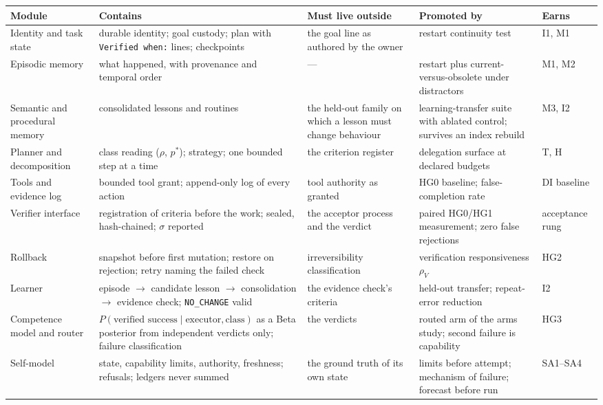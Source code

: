 \begin{table}[!htbp]
\centering\scriptsize
\begin{tabularx}{\textwidth}{@{}lYYYl@{}}
\toprule
Module & Contains & Must live outside & Promoted by & Earns \\
\midrule
Identity and task state & durable identity; goal custody; plan with \texttt{Verified when:} lines; checkpoints & the goal line as authored by the owner & restart continuity test & I1, M1 \\
Episodic memory & what happened, with provenance and temporal order & --- & restart plus current-versus-obsolete under distractors & M1, M2 \\
Semantic and procedural memory & consolidated lessons and routines & the held-out family on which a lesson must change behaviour & learning-transfer suite with ablated control; survives an index rebuild & M3, I2 \\
Planner and decomposition & class reading ($\rho$, $p^{*}$); strategy; one bounded step at a time & the criterion register & delegation surface at declared budgets & T, H \\
Tools and evidence log & bounded tool grant; append-only log of every action & tool authority as granted & HG0 baseline; false-completion rate & DI baseline \\
Verifier interface & registration of criteria before the work; sealed, hash-chained; $\sigma$ reported & the acceptor process and the verdict & paired HG0/HG1 measurement; zero false rejections & acceptance rung \\
Rollback & snapshot before first mutation; restore on rejection; retry naming the failed check & irreversibility classification & verification responsiveness $\rho_V$ & HG2 \\
Learner & episode $\to$ candidate lesson $\to$ consolidation $\to$ evidence check; \texttt{NO\_CHANGE} valid & the evidence check's criteria & held-out transfer; repeat-error reduction & I2 \\
Competence model and router & $P(\text{verified success}\mid\text{executor},\text{class})$ as a Beta posterior from independent verdicts only; failure classification & the verdicts & routed arm of the arms study; second failure is capability & HG3 \\
Self-model & state, capability limits, authority, freshness; refusals; ledgers never summed & the ground truth of its own state & limits before attempt; mechanism of failure; forecast before run & SA1--SA4 \\

\end{tabularx}
\end{table}
